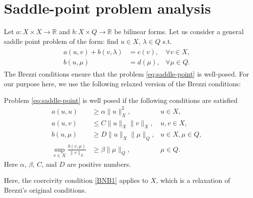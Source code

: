 \documentclass[r]{siamart171218}
\begin{document}
\section{Saddle-point problem analysis}
Let $a: X \times X \rightarrow \mathbb{R}$ and $b: X\times Q \rightarrow \mathbb{R}$ be bilinear forms. Let us consider a general saddle point problem of the form: find $u\in X$, $\lambda\in Q$ s.t.
\begin{eqnarray}\label{eq:saddle-point}
\begin{aligned}
a(u,v)+b(v,\lambda)&=c(v), &\forall v\in X,\\
b(u,\mu)&=d(\mu), &\forall \mu\in Q.
\end{aligned}
\end{eqnarray}
The Brezzi conditions \cite{MR365287} ensure that the problem \eqref{eq:saddle-point} is well-posed.
For our purpose here, we use the following relaxed version of the Brezzi conditions:  
\begin{theorem}{}\label{th:bnb}
Problem \eqref{eq:saddle-point} is well posed if the following conditions are satisfied
\begin{align}\label{BNB1}
a(u,u) &\ge \alpha \|u\|^2_{X}, & u\in X,\\
\label{BNB2}
a(u,v) &\le C \|u\|_{X}\|v\|_{X}, & u,v \in X,\\
\label{BNB3}
b(u,\mu) &\ge D \|u\|_{X} \|\mu\|_{Q}, & u\in X, \mu\in Q,\\
\label{BNB4}
\sup_{v\in X} \frac{b(v,\mu)}{\|v\|_{X}} &\geq \beta\|\mu\|_{Q}, & \mu \in Q .
\end{align}
Here $\alpha$, $\beta$, $C$, and $D$ are positive numbers. 
\end{theorem} 
Here, the coercivity condition \eqref{BNB1} applies to $X$, which is a relaxation of Brezzi's original conditions.  


\end{document}
